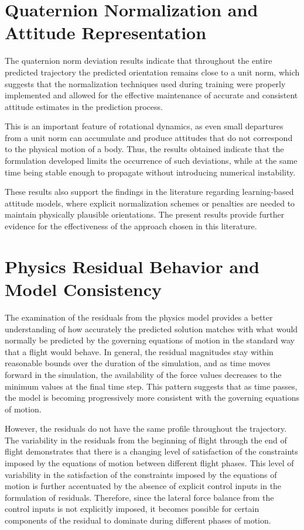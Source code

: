 \section{Quaternion Normalization and Attitude Representation}
The quaternion norm deviation results indicate that throughout the entire predicted trajectory the predicted 
orientation remains close to a unit norm, which suggests that the normalization techniques used during training 
were properly implemented and allowed for the effective maintenance of accurate and consistent attitude estimates 
in the prediction process.

This is an important feature of rotational dynamics, as even small departures from a unit norm can accumulate and 
produce attitudes that do not correspond to the physical motion of a body. Thus, the results obtained indicate that 
the formulation developed limits the occurrence of such deviations, while at the same time being stable enough to 
propagate without introducing numerical instability.

These results also support the findings in the literature regarding learning-based attitude models, where explicit 
normalization schemes or penalties are needed to maintain physically plausible orientations. The present results 
provide further evidence for the effectiveness of the approach chosen in this literature.

\section{Physics Residual Behavior and Model Consistency}

The examination of the residuals from the physics model provides a better understanding of how accurately the 
predicted solution matches with what would normally be predicted by the governing equations of motion in the 
standard way that a flight would behave. In general, the residual magnitudes stay within reasonable bounds over 
the duration of the simulation, and as time moves forward in the simulation, the availability of the force values 
decreases to the minimum values at the final time step. This pattern suggests that as time passes, the model is becoming 
progressively more consistent with the governing equations of motion.

However, the residuals do not have the same profile throughout the trajectory. The variability in the residuals from the 
beginning of flight through the end of flight demonstrates that there is a changing level of satisfaction of the constraints 
imposed by the equations of motion between different flight phases. This level of variability in the satisfaction of the 
constraints imposed by the equations of motion is further accentuated by the absence of explicit control inputs in the 
formulation of residuals. Therefore, since the lateral force balance from the control inputs is not explicitly imposed, it 
becomes possible for certain components of the residual to dominate during different phases of motion.

